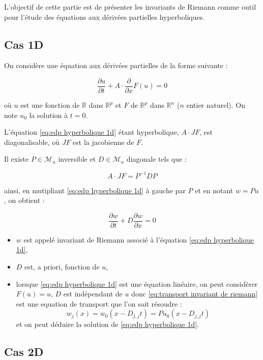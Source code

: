 
L'objectif de cette partie est de présenter les invariants de Riemann comme outil pour l'étude des équations aux dérivées partielles hyperboliques.

\subsection{Cas 1D}

On considère une équation aux dérivées partielles de la forme suivante :

\begin{equation}
\dfrac{\partial u}{\partial t} + A \cdot \dfrac{\partial}{\partial x} F(u) = 0
\label{eq:edp hyperbolique 1d}
\end{equation}

où $u$ est une fonction de $\mathbb{R}$ dans $\mathbb{R}^p$ et $F$ de $\mathbb{R}^p$ dans $\mathbb{R}^n$ ($n$ entier naturel). On note $u_0$ la solution à $t=0$.

L'équation \eqref{eq:edp hyperbolique 1d} étant hyperbolique, $A  \cdot J F$, est diagonalisable, où $J F$ est la jacobienne de $F$.

Il existe $P \in \mathcal{M}_n$ inversible et $D \in \mathcal{M}_ n$ diagonale tels que :

\begin{equation}
A \cdot JF = P^{-1} D P
\end{equation}

ainsi, en mutipliant \eqref{eq:edp hyperbolique 1d} à gauche par $P$ et en notant $w = P u$, on obtient :

\begin{equation}
\dfrac{\partial w}{\partial t} + D \dfrac{\partial w}{\partial x} = 0
\label{eq:transport invariant de riemann}
\end{equation}

\begin{remarque}
\begin{itemize}
\item $w$ est appelé invariant de Riemann associé à l'équation \eqref{eq:edp hyperbolique 1d},
\item $D$ est, a priori, fonction de $u$,
\item lorsque \eqref{eq:edp hyperbolique 1d} est une équation linéaire, on peut considèrer $F(u) = u$, $D$ est indépendant de $u$ donc \eqref{eq:transport invariant de riemann} est une equation de transport que l'on sait résoudre :
\begin{equation}
w_j(x) = w_0 ( x - D_{j,j} t) = P u_0 ( x - D_{j,j} t )
\end{equation} 
et on peut déduire la solution de \eqref{eq:edp hyperbolique 1d}.
\end{itemize}
\end{remarque}

\subsection{Cas 2D}